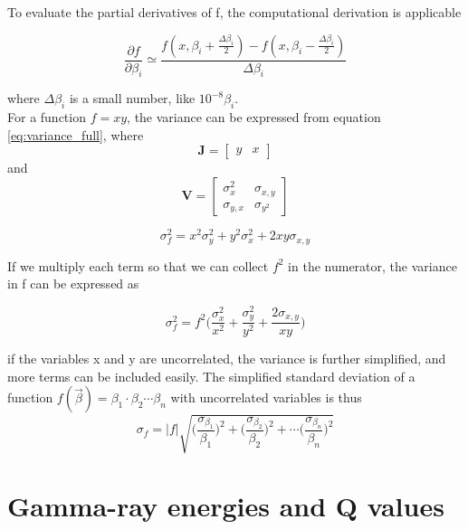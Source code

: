 \documentclass[a4paper,11pt,twoside]{book}
\begin{document}
\noindent To evaluate the partial derivatives of f, the computational derivation is applicable

\begin{equation}
    \frac{\partial f}{\partial \beta_i} \simeq\frac{f(x, \beta_i + \frac{\Delta \beta_i}{2}) - f(x, \beta_i-\frac{\Delta \beta_i}{2})}{\Delta \beta_i}
\end{equation}

\noindent where $\Delta\beta_i$ is a small number, like $10^{-8}\beta_i$. \\


\noindent 
For a function $f=xy $, the variance can be expressed from equation \ref{eq:variance_full}, where  $$\mathbf{J}=\begin{bmatrix}y & x \end{bmatrix}$$ and $$\mathbf{V}=\begin{bmatrix} \sigma_x^2 & \sigma_{x,y}\\\sigma_{y,x} & \sigma_{y^2} \end{bmatrix}$$ 

\begin{equation}
    \sigma_f^2 = x^2\sigma_y^2 + y^2\sigma_x^2 + 2 xy \sigma_{x,y}
\end{equation}

\noindent If we multiply each term so that we can collect $f^2$ in the numerator, the variance in f can be expressed as 

\begin{equation}
    \sigma_f^2 = f^2 \big( \frac{\sigma_x^2}{x^2} + \frac{\sigma_y^2}{y^2} + \frac{2\sigma_{x,y}}{xy} \Big)
\end{equation}

\noindent if the variables x and y are uncorrelated, the variance is further simplified, and more terms can be included easily. The simplified standard deviation of a function $f(\vec{\beta})=\beta_1 \cdot \beta_2 \cdots \beta_n $ with uncorrelated variables is thus
\begin{equation} \label{eq:uncertainty_simplification}
    \sigma_f = |f|\sqrt{ \Big( \frac{\sigma_{\beta_1}}{\beta_1}\Big)^2 +  \Big( \frac{\sigma_{\beta_2}}{\beta_2}\Big)^2 + \cdots  \Big( \frac{\sigma_{\beta_n}}{\beta_n}\Big)^2    } 
\end{equation}



\chapter{Gamma-ray energies and Q values}
\end{document}
